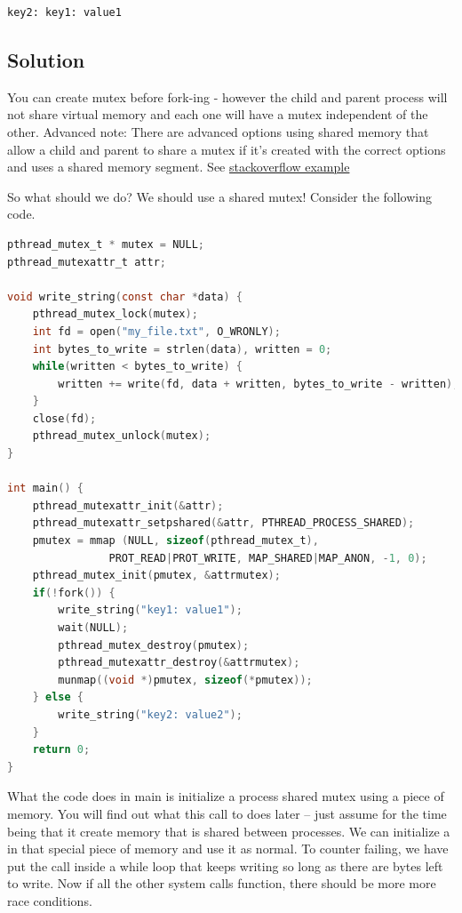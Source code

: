 \begin{lstlisting}
key2: key1: value1
\end{lstlisting}

\subsection{Solution}

You can create mutex before fork-ing - however the child and parent process will not share virtual memory and each one will have a mutex independent of the other.
Advanced note: There are advanced options using shared memory that allow a child and parent to share a mutex if it's created with the correct options and uses a shared memory segment.
See \href{http://stackoverflow.com/questions/19172541/procs-fork-and-mutexes}{stackoverflow example}

So what should we do? We should use a shared mutex! Consider the following code.

\begin{lstlisting}[language=C]
pthread_mutex_t * mutex = NULL;
pthread_mutexattr_t attr;

void write_string(const char *data) {
    pthread_mutex_lock(mutex);
    int fd = open("my_file.txt", O_WRONLY);
    int bytes_to_write = strlen(data), written = 0;
    while(written < bytes_to_write) {
        written += write(fd, data + written, bytes_to_write - written);
    }
    close(fd);
    pthread_mutex_unlock(mutex);
}

int main() {
    pthread_mutexattr_init(&attr);
    pthread_mutexattr_setpshared(&attr, PTHREAD_PROCESS_SHARED);
    pmutex = mmap (NULL, sizeof(pthread_mutex_t),
                PROT_READ|PROT_WRITE, MAP_SHARED|MAP_ANON, -1, 0);
    pthread_mutex_init(pmutex, &attrmutex);
    if(!fork()) {
        write_string("key1: value1");
        wait(NULL);
        pthread_mutex_destroy(pmutex);
        pthread_mutexattr_destroy(&attrmutex);
        munmap((void *)pmutex, sizeof(*pmutex));
    } else {
        write_string("key2: value2");
    }
    return 0;
}
\end{lstlisting}

What the code does in main is initialize a process shared mutex using a piece of  memory.
You will find out what this call to  does later -- just assume for the time being that it create memory that is shared between processes.
We can initialize a  in that special piece of memory and use it as normal.
To counter  failing, we have put the  call inside a while loop that keeps writing so long as there are bytes left to write.
Now if all the other system calls function, there should be more more race conditions.

